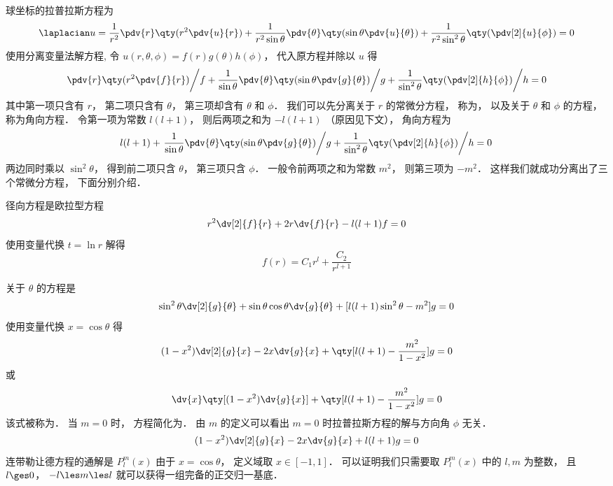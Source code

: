 

球坐标的拉普拉斯方程为
\begin{equation}
\laplacian u = \frac{1}{r^2} \pdv{r} \qty(r^2 \pdv{u}{r}) + \frac{1}{r^2 \sin\theta}\pdv{\theta} \qty(\sin \theta \pdv{u}{\theta}) + \frac{1}{r^2 \sin^2 \theta} \qty(\pdv[2]{u}{\phi}) = 0
\end{equation}
使用分离变量法解方程, 令 $u(r, \theta, \phi) = f(r)g(\theta)h(\phi)$， 代入原方程并除以 $u$ 得
\begin{equation}
\left. \pdv{r} \qty(r^2 \pdv{f}{r}) \middle/ f + \frac{1}{\sin\theta}\pdv{\theta} \qty(\sin \theta \pdv{g}{\theta}) \middle/ g + \frac{1}{\sin^2 \theta} \qty(\pdv[2]{h}{\phi}) \middle/ h = 0 \right.
\end{equation}
其中第一项只含有 $r$， 第二项只含有 $\theta$， 第三项却含有 $\theta$ 和 $\phi$． 我们可以先分离关于 $r$ 的常微分方程， 称为， 以及关于 $\theta$ 和 $\phi$ 的方程， 称为角向方程． 令第一项为常数 $l(l+1)$， 则后两项之和为 $-l(l+1)$ （原因见下文）， 角向方程为
\begin{equation}\label{SphLap_eq3}
l(l+1) + \left. \frac{1}{\sin\theta}\pdv{\theta} \qty(\sin \theta \pdv{g}{\theta}) \middle/ g + \frac{1}{\sin^2 \theta} \qty(\pdv[2]{h}{\phi}) \middle/ h = 0 \right.
\end{equation}
两边同时乘以 $\sin^2\theta$， 得到前二项只含 $\theta$， 第三项只含 $\phi$． 一般令前两项之和为常数 $m^2$， 则第三项为 $-m^2$． 这样我们就成功分离出了三个常微分方程， 下面分别介绍．

径向方程是欧拉型方程%
\begin{equation}
r^2\dv[2]{f}{r} + 2r\dv{f}{r} - l(l+1)f = 0
\end{equation}
使用变量代换 $t = \ln r$ 解得
\begin{equation}
f(r) = C_1 r^l + \frac{C_2}{r^{l+1}}
\end{equation}

关于 $\theta$ 的方程是
\begin{equation}
\sin^2\theta \dv[2]{g}{\theta} + \sin\theta\cos\theta\dv{g}{\theta} + [l(l+1)\sin^2\theta - m^2] g = 0
\end{equation}
使用变量代换 $x = \cos\theta$ 得
\begin{equation}
(1-x^2)\dv[2]{g}{x} - 2x\dv{g}{x} + \qty[l(l+1) - \frac{m^2}{1-x^2}]g = 0
\end{equation}
或
\begin{equation}
\dv{x} \qty[(1-x^2)\dv{g}{x}] + \qty[l(l+1) - \frac{m^2}{1-x^2}]g = 0
\end{equation}
该式被称为． 当 $m = 0$ 时， 方程简化为． 由 $m$ 的定义可以看出 $m = 0$ 时拉普拉斯方程的解与方向角 $\phi$ 无关．
\begin{equation}
(1-x^2)\dv[2]{g}{x} - 2x\dv{g}{x} + l(l+1)g = 0
\end{equation}
连带勒让德方程的通解是%
$P_l^m(x)$ 由于 $x = \cos\theta$， 定义域取 $x \in [-1, 1]$． 可以证明我们只需要取 $P_l^m(x)$ 中的 $l, m$ 为整数， 且 $l \ges 0$， $-l \les m \les l$ 就可以获得一组完备的正交归一基底． %

